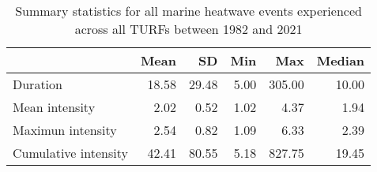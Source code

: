\begin{table}

\caption{\label{tab:mhw\_summary\_stats}Summary statistics for all marine heatwave events experienced across all TURFs between 1982 and 2021}
\centering
\begin{tabular}[t]{lrrrrr}
\toprule
  & Mean & SD & Min & Max & Median\\
\midrule
Duration & \num{18.58} & \num{29.48} & \num{5.00} & \num{305.00} & \num{10.00}\\
Mean intensity & \num{2.02} & \num{0.52} & \num{1.02} & \num{4.37} & \num{1.94}\\
Maximun intensity & \num{2.54} & \num{0.82} & \num{1.09} & \num{6.33} & \num{2.39}\\
Cumulative intensity & \num{42.41} & \num{80.55} & \num{5.18} & \num{827.75} & \num{19.45}\\
\bottomrule
\end{tabular}
\end{table}
